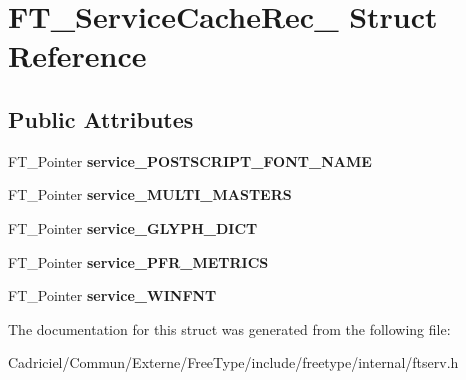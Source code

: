 \hypertarget{struct_f_t___service_cache_rec__}{}\section{F\+T\+\_\+\+Service\+Cache\+Rec\+\_\+ Struct Reference}
\label{struct_f_t___service_cache_rec__}
\subsection*{Public Attributes}
\begin{DoxyCompactItemize}
\item 
F\+T\+\_\+\+Pointer {\bfseries service\+\_\+\+P\+O\+S\+T\+S\+C\+R\+I\+P\+T\+\_\+\+F\+O\+N\+T\+\_\+\+N\+A\+ME}\hypertarget{struct_f_t___service_cache_rec___a1b95ee574621c8b031fe239d449bfa5c}{}\label{struct_f_t___service_cache_rec___a1b95ee574621c8b031fe239d449bfa5c}

\item 
F\+T\+\_\+\+Pointer {\bfseries service\+\_\+\+M\+U\+L\+T\+I\+\_\+\+M\+A\+S\+T\+E\+RS}\hypertarget{struct_f_t___service_cache_rec___abf51ac75b59eeac29ad5e4bbbc50e749}{}\label{struct_f_t___service_cache_rec___abf51ac75b59eeac29ad5e4bbbc50e749}

\item 
F\+T\+\_\+\+Pointer {\bfseries service\+\_\+\+G\+L\+Y\+P\+H\+\_\+\+D\+I\+CT}\hypertarget{struct_f_t___service_cache_rec___af8bbf442f497ad21666069ec33aaa88a}{}\label{struct_f_t___service_cache_rec___af8bbf442f497ad21666069ec33aaa88a}

\item 
F\+T\+\_\+\+Pointer {\bfseries service\+\_\+\+P\+F\+R\+\_\+\+M\+E\+T\+R\+I\+CS}\hypertarget{struct_f_t___service_cache_rec___ac5d029d7f442e8b727c40d5a88faa344}{}\label{struct_f_t___service_cache_rec___ac5d029d7f442e8b727c40d5a88faa344}

\item 
F\+T\+\_\+\+Pointer {\bfseries service\+\_\+\+W\+I\+N\+F\+NT}\hypertarget{struct_f_t___service_cache_rec___abb824452cfb20932fbd22405323781f9}{}\label{struct_f_t___service_cache_rec___abb824452cfb20932fbd22405323781f9}

\end{DoxyCompactItemize}


The documentation for this struct was generated from the following file\+:\begin{DoxyCompactItemize}
\item 
Cadriciel/\+Commun/\+Externe/\+Free\+Type/include/freetype/internal/ftserv.\+h\end{DoxyCompactItemize}
